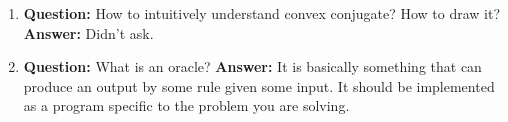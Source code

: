 \documentclass[12pt]{article}
\begin{document}
\begin{enumerate}
\item \textbf{Question:} How to intuitively understand convex conjugate? How to draw it?
  \textbf{Answer:} Didn't ask.

\item \textbf{Question:} What is an oracle?
  \textbf{Answer:} It is basically something that can produce an output by some rule given some input. It should be implemented as a program specific to the problem you are solving.
  
\end{enumerate}




\end{document}
